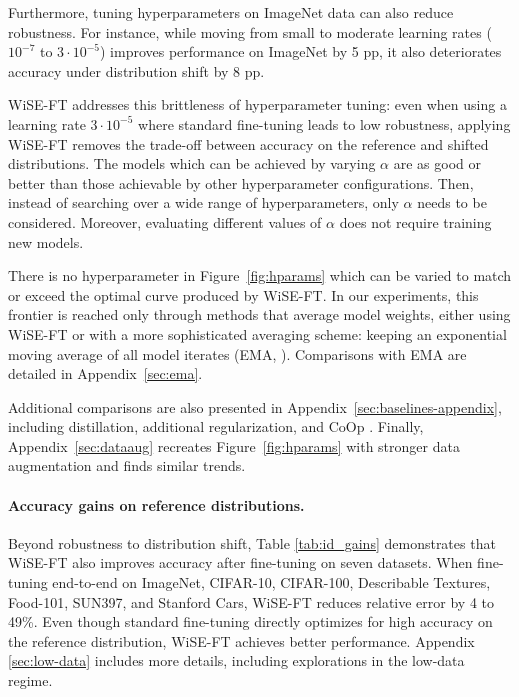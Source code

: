 Furthermore, tuning hyperparameters on ImageNet data can also reduce robustness. For instance, while moving from small to moderate learning rates ($10^{-7}$ to $3 \cdot 10^{-5}$) improves performance on ImageNet by 5 pp, it also deteriorates accuracy under distribution shift by 8 pp.

WiSE-FT addresses this brittleness of hyperparameter tuning: even when using a learning rate $3 \cdot 10^{-5}$ where standard fine-tuning leads to low robustness, applying WiSE-FT removes the trade-off between accuracy on the reference and shifted distributions. 
The models which can be achieved by varying $\alpha$ are as good or better than those achievable by other hyperparameter configurations. Then, instead of searching over a wide range of hyperparameters, only $\alpha$ needs to be considered. Moreover, evaluating different values of $\alpha$ does not require training new models.

There is no hyperparameter in Figure~\ref{fig:hparams} which can be varied to match or exceed the optimal curve produced by WiSE-FT.
In our experiments, this frontier is reached only through methods that average model weights, either using WiSE-FT or
with a more sophisticated averaging scheme: keeping an exponential moving average of all model iterates (EMA, \cite{szegedy2016rethinking}).
Comparisons with EMA are detailed in Appendix~\ref{sec:ema}.


Additional comparisons are also presented in Appendix~\ref{sec:baselines-appendix}, including distillation, additional regularization, and CoOp \cite{coop}. Finally, Appendix~\ref{sec:dataaug} recreates Figure~\ref{fig:hparams} with stronger data augmentation and finds similar trends.







\paragraph{Accuracy gains on reference distributions.}
Beyond robustness to distribution shift, Table \ref{tab:id_gains} demonstrates that WiSE-FT also improves accuracy after fine-tuning on seven datasets. When fine-tuning end-to-end on ImageNet, CIFAR-10, CIFAR-100, Describable Textures, Food-101, SUN397, and Stanford Cars, WiSE-FT reduces relative error by 4 to 49\%.
Even though standard fine-tuning directly optimizes for high accuracy on the reference distribution, WiSE-FT achieves better performance.
Appendix \ref{sec:low-data} includes more details, including explorations in the low-data regime.






